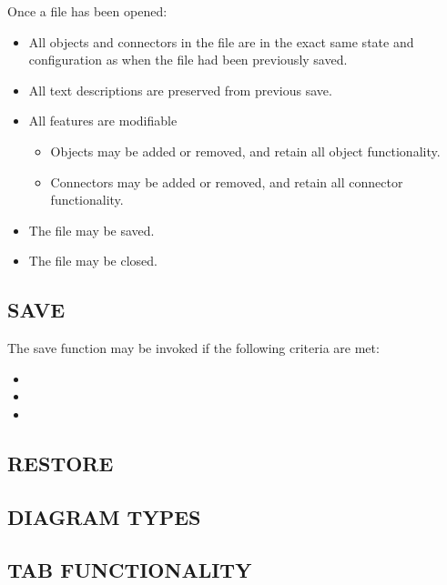 \documentclass[twoside,letterpaper]{article}
\begin{document}
Once a file has been opened:
\begin{itemize}
\item All objects and connectors in the file are in the exact same state and configuration as when the file had been previously saved.
\item All text descriptions are preserved from previous save.
\item All features are modifiable
\begin{itemize}
\item Objects may be added or removed, and retain all object functionality.
\item Connectors may be added or removed, and retain all connector functionality.
\end{itemize}
\item The file may be saved.
\item The file may be closed.
\end{itemize}

\bigskip

\subsection[SAVE]{\bfseries SAVE}

The save function may be invoked if the following criteria are met: 
\begin{itemize}
\item 
\item 
\item 
\end{itemize}

\bigskip

\subsection[RESTORE]{\bfseries RESTORE}

\bigskip

\subsection[DIAGRAM TYPES]{\bfseries DIAGRAM TYPES}

\bigskip

\subsection[TAB FUNCTIONALITY]{\bfseries TAB FUNCTIONALITY}

\bigskip
\end{document}
